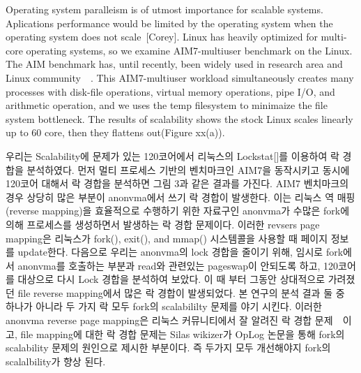 Operating system paralleism is of utmost importance for scalable systems.
Aplications performance would be limited by the operating system when the
operating system does not scale~\cite{Clements15SCR}[Corey].
Linux has heavily optimized for multi-core operating systems, so we examine
AIM7-multiuser benchmark on the Linux.
The AIM benchmark has, until recently, been widely used in research area
and Linux community~\cite{Bueso2015STP}~\cite{Bueso2014MCS}.
This AIM7-multiuser workload simultaneously creates many processes with
disk-file operations, virtual memory operations, pipe I/O, and arithmetic
operation, and we uses the temp filesystem to minimaize the file system
bottleneck.
The results of scalability shows the stock Linux scales linearly up to 60 core,
then they flattens out(Figure xx(a)).
\fi


\ifkor
우리는 Scalability에 문제가 있는 120코어에서 리눅스의 Lockstat[]를 이용하여 락 경합을 분석하였다. 
먼저 멀티 프로세스 기반의 벤치마크인 AIM7을 동작시키고 동시에 120코어 대해서 락 경합을 분석하면 
그림 3과 같은 결과를 가진다. 
AIM7 벤치마크의 경우 상당히 많은 부분이 anonvma에서 쓰기 락 경합이 발생한다. 
이는 리눅스 역 매핑(reverse mapping)을 효율적으로 수행하기 위한 자료구인 anonvma가
수많은 fork에 의해 프로세스를 생성하면서 발생하는 락 경합 문제이다. 
이러한 revsers page mapping은 리눅스가 fork(), exit(), and mmap() 시스템콜을 사용할 때 페이지 정보를
update한다.
다음으로 우리는 anonvma의 lock 경합을 줄이기 위해, 임시로 fork에서 anonvma를 호출하는 부분과 read와
관련있는 pageswap이 안되도록 하고, 120코어를 대상으로 다시 Lock 경합을 분석하여 보았다.
이 때 부터 그동안 상대적으로 가려졌던 file reverse mapping에서 많은 락 경합이 발생되었다.
본 연구의 분석 결과 둘 중 하나가 아니라 두 가지 락 모두 fork의 scalabililty 문제를 야기 시킨다.
이러한 anonvma reverse page mapping은 리눅스 커뮤니티에서 잘 알려진 락 경합
문제~\cite{Andi2011adding}~\cite{Tim2013adding}이고, file mapping에 대한 락 경합 문제는
Silas wikizer가 OpLog 논문을 통해 fork의 scalability 문제의 원인으로 제시한 부분이다.
즉 두가지 모두 개선해야지 fork의 scalalbility가 향상 된다. 
\else


